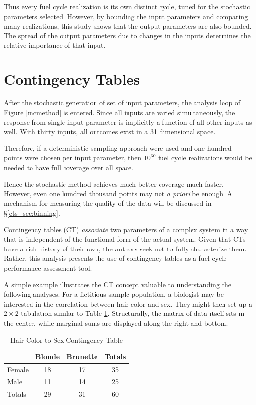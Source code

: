 Thus every fuel cycle realization is its own distinct cycle, tuned for the stochastic parameters selected.
However, by bounding the input parameters and comparing many realizations, this study shows that the
output parameters are also bounded.  The spread of the output parameters due to changes in the inputs
determines the relative importance of that input.


\section{Contingency Tables}
\label{cts_sec:ct}

After the stochastic generation of set of input parameters, the analysis loop of Figure \ref{mcmethod} is entered.
Since all inputs are varied simultaneously, the response from single input parameter is implicitly
a function of all other inputs as well.  With thirty inputs, all outcomes exist in a 31 dimensional space.

Therefore, if a deterministic sampling approach were used and one hundred points
were chosen per input parameter, then $10^{60}$ fuel cycle realizations would be 
needed to have full coverage over all space.

Hence the stochastic method achieves much better coverage much faster.  However, 
even one hundred thousand points may not \emph{a priori} be enough.  A mechanism 
for measuring the quality of the data will be discussed in \S \ref{cts_sec:binning}.

Contingency tables (CT) \cite{Everitt1992,Press2007,Yao2003} \emph{associate} two parameters of a
complex system in a way that is independent of the functional form of the actual system.
Given that CTs have a rich history of their own, the authors seek not to fully characterize them.  
Rather, this analysis presents the use of contingency tables as a fuel cycle performance assessment tool.

A simple example illustrates the CT concept valuable to understanding the following analyses.  For a 
fictitious sample population, a biologist may be interested in the correlation between hair color and sex.  
They might then set up a $2\times 2$ tabulation similar to Table \ref{biotable}.  Structurally, the matrix of 
data itself sits in the center, while marginal sums are displayed along the right and bottom.

\begin{table}[htbp]
\begin{center}
\caption{Hair Color to Sex Contingency Table}
\label{biotable}
\begin{tabular}{|l||c|c||c|}
\hline
       & Blonde & Brunette & Totals \\
\hline
Female & 18     & 17       & 35 \\
\hline
Male   & 11     & 14       & 25 \\
\hline
Totals & 29     & 31       & 60 \\
\hline
\end{tabular}
\end{center}
\end{table}

